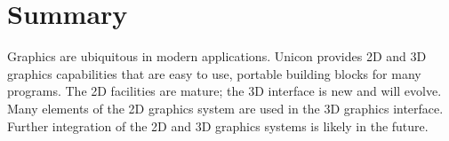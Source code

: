 \section*{Summary}

Graphics are ubiquitous in modern applications. Unicon provides 2D and
3D graphics capabilities that are easy to use, portable building blocks
for many programs. The 2D facilities are mature; the 3D interface is
new and will evolve. Many elements of the 2D graphics system are used
in the 3D graphics interface. Further integration of the 2D and 3D
graphics systems is likely in the future.
